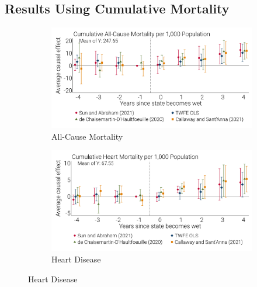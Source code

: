 \documentclass[12pt]{article}
\begin{document}
\FloatBarrier
\newpage 
{}
\begin{landscape}
\section[Results Using Cumulative Mortality]{Results Using Cumulative Mortality\label{sec:cumulative-mortality}}
\begin{figure}[!ht]
    \caption[Cumulative Mortality Event Studies By Cause of Death]{Cumulative Mortality Event Studies By Cause of Death}
    \centering
    \begin{subfigure}{0.47\linewidth}
        \centering 
        \caption[All-Cause Mortality]{All-Cause Mortality}        
        \includegraphics[width=1.0\linewidth]{../analysis/output/appendix/figure_d1a_es_cumulative_deaths.png}
    \end{subfigure}
    \begin{subfigure}{0.47\linewidth}
        \centering 
        \caption[Heart Disease]{Heart Disease}        
        \includegraphics[width=1.0\linewidth]{../analysis/output/appendix/figure_d1b_es_cumulative_heart.png}

\end{subfigure}
\end{figure}
\end{landscape}
\end{document}
